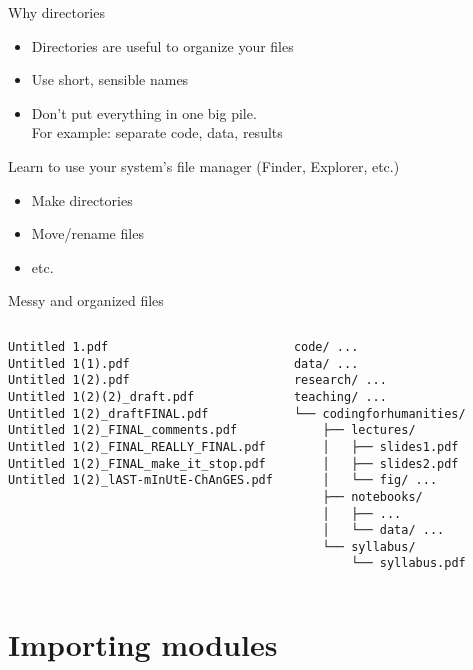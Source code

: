 \documentclass[aspectratio=169,usenames,dvipsnames]{beamer}
\begin{document}
\begin{frame}{Why directories}
    \begin{itemize}
        \item Directories are useful to organize your files
        \item Use short, sensible names
        \item Don't put everything in one big pile. \\
            For example: separate code, data, results
    \end{itemize}
    \pause 
    Learn to use your system's file manager (Finder, Explorer, etc.)
    \begin{itemize}
        \item Make directories
        \item Move/rename files
        \item etc.
    \end{itemize}
    
\end{frame}

\begin{frame}[fragile]{Messy and organized files}
\begin{columns}
\begin{verbatim}
Untitled 1.pdf
Untitled 1(1).pdf
Untitled 1(2).pdf
Untitled 1(2)(2)_draft.pdf
Untitled 1(2)_draftFINAL.pdf
Untitled 1(2)_FINAL_comments.pdf
Untitled 1(2)_FINAL_REALLY_FINAL.pdf
Untitled 1(2)_FINAL_make_it_stop.pdf
Untitled 1(2)_lAST-mInUtE-ChAnGES.pdf
\end{verbatim}
\pause
{}
\begin{verbatim}
code/ ...
data/ ...
research/ ...
teaching/ ...
└── codingforhumanities/
    ├── lectures/
    │   ├── slides1.pdf
    │   ├── slides2.pdf
    │   └── fig/ ...
    ├── notebooks/
    │   ├── ...
    │   └── data/ ...
    └── syllabus/
        └── syllabus.pdf
\end{verbatim}
\end{columns}
\end{frame}


\section{Importing modules}
\frame{\tableofcontents[currentsection]}
\end{document}
